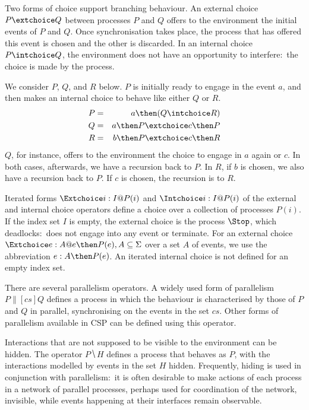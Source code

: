 Two forms of choice support branching behaviour. An external choice $P
\extchoice Q$ between processes $P$ and $Q$ offers to the environment the
initial events of $P$ and $Q$. Once synchronisation takes place, the process
that has offered this event is chosen and the other is discarded. In an
internal choice $P \intchoice Q$, the environment does not have an
opportunity to interfere:~the choice is made by the process.
%
\begin{example}\label{example:CSP}
  We consider $P$, $Q$, and $R$ below. $P$ is initially
  ready to engage in the event $a$, and then makes an internal  choice to
  behave like either $Q$ or $R$.
  \begin{eqnarray*}
  P & = & a \then (Q\intchoice R)
  \\
  Q & = & a \then P \extchoice c \then P
  \\
  R & = & b \then P \extchoice c \then R
  \end{eqnarray*}
  $Q$, for instance, offers to the environment the choice to engage in $a$
  again or $c$. In both cases, afterwards, we have a recursion back to $P$.
  In $R$, if $b$ is chosen, we also have a recursion back to $P$. If $c$ is
  chosen, the recursion is to $R$.
  \xbox
\end{example}
%
Iterated forms $\Extchoice i: I @ P(i)$ and $\Intchoice i: I @ P(i)$ of the
external and internal choice operators define a choice over a collection of
processes $P(i)$. If the index set $I$ is empty, the external choice is the
process $\Stop$, which deadlocks:~does not engage into any event or
terminate. For an external choice $\Extchoice e: A @ e \then P(e), A\subseteq
\Sigma$ over a set $A$ of events, we use the abbreviation $e:A \then P(e)$.
An iterated internal choice is not defined for an empty index set.

There are several parallelism operators. A widely used form of parallelism $P
\parallel[cs] Q$ defines a process in which the behaviour is characterised by
those of $P$ and $Q$ in parallel, synchronising on the events in the set
$cs$. Other forms of parallelism available in CSP can be defined using this
operator.

Interactions that are not supposed to be visible to the environment can be
hidden. The operator $P \hide H$ defines a process that behaves as $P$, with
the interactions modelled by events in the set $H$ hidden. Frequently, hiding
is used in conjunction with parallelism:~it is often desirable to make
actions of each process in a network of parallel processes, perhaps used for
coordination of the network, invisible, while events happening at their
interfaces remain observable.

